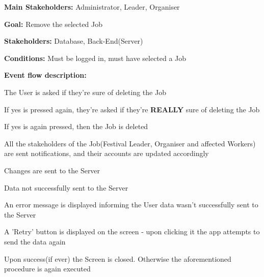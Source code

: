 			\noindent {}
			\begin{packed_item}
				\item \textbf{Main Stakeholders:} Administrator, Leader, Organiser
				\item \textbf{Goal:} Remove the selected Job
				\item \textbf{Stakeholders: } Database, Back-End(Server)
				\item \textbf{Conditions: } Must be logged in, must have selected a Job
				\item \textbf{Event flow description: }
				\begin{packed_enum}
					\item The User is asked if they're sure of deleting the Job
					\item If yes is pressed again, they're asked if they're \textbf{REALLY} sure of deleting the Job
					\item If yes is again pressed, then the Job is deleted
					\item All the stakeholders of the Job(Festival Leader, Organiser and affected Workers) are sent notifications, and their accounts are updated accordingly
					\item Changes are sent to the Server
				\end{packed_enum}
				
				\begin{packed_item}
					\item[5.a] Data not successfully sent to the Server
					\item[] \begin{packed_enum}
						\item An error message is displayed informing the User data wasn't successfully sent to the Server
						\item A 'Retry' button is displayed on the screen - upon clicking it the app attempts to send the data again
						\item Upon success(if ever) the Screen is closed. Otherwise the aforementioned procedure is again executed
					\end{packed_enum}
				\end{packed_item}
			\end{packed_item}
			
